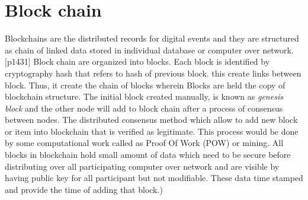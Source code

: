 \section{Block chain}
Blockchains are the distributed records for digital events and they are structured as chain of linked data stored in individual database or computer over network.[p1431]
Block chain are organized into blocks. Each  block is identified by cryptography hash that refers to hash of previous block. this create links between block. Thus, it create the chain of blocks wherein Blocks are held the copy of blockchain structure. The initial block created manually, is known as \textit {genesis block} and the other node will add to block chain after a process of consensus between nodes. The distributed consensus method which allow to add new block or item into blockchain that is verified as legitimate. This process would be done by some computational work called as Proof Of Work (POW) or mining.
All blocks in blockchain hold small amount of data which need to be secure before distributing over all participating computer over network and are visible by having public key for all participant but not modifiable. These data time stamped and provide the time of adding that block.)

